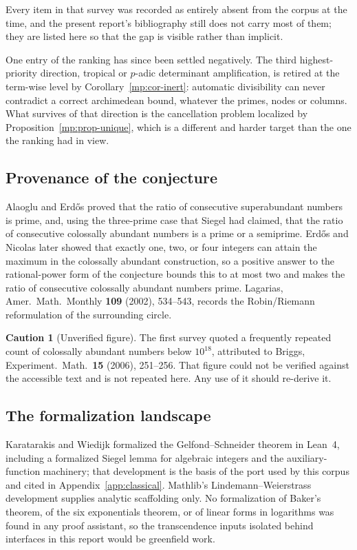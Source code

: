 \documentclass[11pt,oneside]{article}
\theoremstyle{definition}
\newtheorem{warning}[theorem]{Caution}
\theoremstyle{remark}
\begin{document}
Every item in that survey was recorded as entirely absent from the corpus at the time, and the
present report's bibliography still does not carry most of them; they are listed here so that
the gap is visible rather than implicit.

One entry of the ranking has since been settled negatively.  The third highest-priority
direction, tropical or $p$-adic determinant amplification, is retired at the term-wise level by
Corollary~\ref{mp:cor-inert}: automatic divisibility can never contradict a correct archimedean
bound, whatever the primes, nodes or columns.  What survives of that direction is the
cancellation problem localized by Proposition~\ref{mp:prop-unique}, which is a different and
harder target than the one the ranking had in view.

\subsection{Provenance of the conjecture}

Alaoglu and Erd\H{o}s proved that the ratio of consecutive superabundant numbers is prime, and,
using the three-prime case that Siegel had claimed, that the ratio of consecutive colossally
abundant numbers is a prime or a semiprime.  Erd\H{o}s and Nicolas later showed that exactly
one, two, or four integers can attain the maximum in the colossally abundant construction, so a
positive answer to the rational-power form of the conjecture bounds this to at most two and
makes the ratio of consecutive colossally abundant numbers prime.  Lagarias, Amer.\ Math.\
Monthly \textbf{109} (2002), 534--543, records the Robin/Riemann reformulation of the
surrounding circle.

\begin{warning}[Unverified figure]
The first survey quoted a frequently repeated count of colossally abundant numbers below
$10^{18}$, attributed to Briggs, Experiment.\ Math.\ \textbf{15} (2006), 251--256.  That figure
could not be verified against the accessible text and is not repeated here.  Any use of it
should re-derive it.
\end{warning}

\subsection{The formalization landscape}

Karatarakis and Wiedijk formalized the Gelfond--Schneider theorem in Lean~4, including a
formalized Siegel lemma for algebraic integers and the auxiliary-function machinery; that
development is the basis of the port used by this corpus and cited in
Appendix~\ref{app:classical}.  Mathlib's Lindemann--Weierstrass development supplies analytic
scaffolding only.  No formalization of Baker's theorem, of the six exponentials theorem, or of
linear forms in logarithms was found in any proof assistant, so the transcendence inputs
isolated behind interfaces in this report would be greenfield work.
\end{document}
